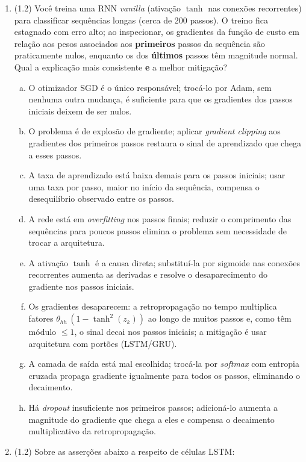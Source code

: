 \documentclass[11pt,a4paper]{article}
\begin{document}
\begin{enumerate}[1)]
\item (1.2) Você treina uma RNN \textit{vanilla} (ativação $\tanh$ nas conexões recorrentes) para classificar sequências longas (cerca de 200 passos). O treino fica estagnado com erro alto; ao inspecionar, os gradientes da função de custo em relação aos pesos associados aos \textbf{primeiros} passos da sequência são praticamente nulos, enquanto os dos \textbf{últimos} passos têm magnitude normal. Qual a explicação mais consistente \textbf{e} a melhor mitigação?
\begin{enumerate}[a)]
    \item O otimizador SGD é o único responsável; trocá-lo por Adam, sem nenhuma outra mudança, é suficiente para que os gradientes dos passos iniciais deixem de ser nulos.
    \item O problema é de explosão de gradiente; aplicar \textit{gradient clipping} aos gradientes dos primeiros passos restaura o sinal de aprendizado que chega a esses passos.
    \item A taxa de aprendizado está baixa demais para os passos iniciais; usar uma taxa por passo, maior no início da sequência, compensa o desequilíbrio observado entre os passos.
    \item A rede está em \textit{overfitting} nos passos finais; reduzir o comprimento das sequências para poucos passos elimina o problema sem necessidade de trocar a arquitetura.
    \item A ativação $\tanh$ é a causa direta; substituí-la por sigmoide nas conexões recorrentes aumenta as derivadas e resolve o desaparecimento do gradiente nos passos iniciais.
    \item Os gradientes desaparecem: a retropropagação no tempo multiplica fatores $\theta_{hh}\,(1 - \tanh^2(z_k))$ ao longo de muitos passos e, como têm módulo $\le 1$, o sinal decai nos passos iniciais; a mitigação é usar arquitetura com portões (LSTM/GRU).
    \item A camada de saída está mal escolhida; trocá-la por \textit{softmax} com entropia cruzada propaga gradiente igualmente para todos os passos, eliminando o decaimento.
    \item Há \textit{dropout} insuficiente nos primeiros passos; adicioná-lo aumenta a magnitude do gradiente que chega a eles e compensa o decaimento multiplicativo da retropropagação.
\end{enumerate}

\item (1.2) Sobre as asserções abaixo a respeito de células LSTM:


\end{enumerate}
\end{document}
